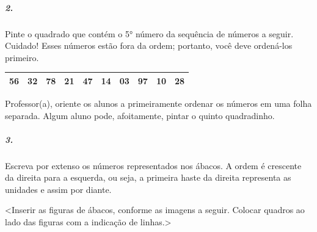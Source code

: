 \subparagraph{2. }\label{section-1}

Pinte o quadrado que contém o 5° número da sequência de números a seguir.
Cuidado! Esses números estão fora da ordem; portanto, você deve
ordená-los primeiro.

\begin{longtable}[]{@{}llllllllll@{}}
\toprule
56 & 32 & 78 & 21 & 47 & 14 & 03 & 97 & 10 & 28\tabularnewline
\bottomrule
\end{longtable}

Professor(a), oriente os alunos a primeiramente ordenar os números em
uma folha separada. Algum aluno pode, afoitamente, pintar o quinto
quadradinho.

\subparagraph{3. }\label{section-2}

Escreva por extenso os números representados nos ábacos. A ordem
é crescente da direita para a esquerda, ou seja, a primeira haste da
direita representa as unidades e assim por diante.

\textless{}Inserir as figuras de ábacos, conforme as imagens a
seguir. Colocar quadros ao lado das figuras com a indicação de
linhas.\textgreater{}


